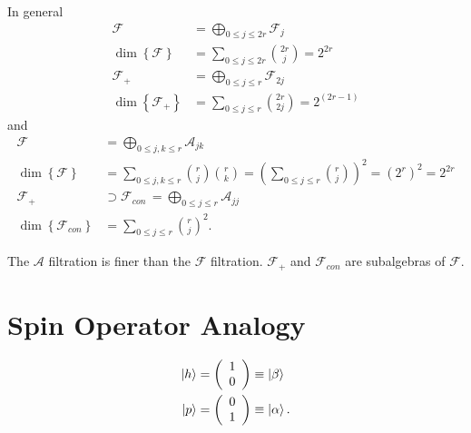 \documentclass[aps,preprint]{revtex4}%
\begin{document}
In general
\begin{align}
\mathcal{F}  &  =%
{\displaystyle\bigoplus\limits_{0\leq j\leq2r}}
\mathcal{F}_{j}\\
\dim\left\{  \mathcal{F}\right\}   &  =%
{\displaystyle\sum\limits_{0\leq j\leq2r}}
\binom{2r}{j}=2^{2r}\\
\mathcal{F}_{+}  &  =%
{\displaystyle\bigoplus\limits_{0\leq j\leq r}}
\mathcal{F}_{2j}\\
\dim\left\{  \mathcal{F}_{+}\right\}   &  =%
{\displaystyle\sum\limits_{0\leq j\leq r}}
\binom{2r}{2j}=2^{\left(  2r-1\right)  }%
\end{align}
and
\begin{align}
\mathcal{F}  &  =%
{\displaystyle\bigoplus\limits_{0\leq j,k\leq r}}
\mathcal{A}_{jk}\\
\dim\left\{  \mathcal{F}\right\}   &  =%
{\displaystyle\sum\limits_{0\leq j,k\leq r}}
\binom{r}{j}\binom{r}{k}=\left(
{\displaystyle\sum\limits_{0\leq j\leq r}}
\binom{r}{j}\right)  ^{2}=\left(  2^{r}\right)  ^{2}=2^{2r}\\
\mathcal{F}_{+}  &  \supset\mathcal{F}_{con}\,\mathcal{=}%
{\displaystyle\bigoplus\limits_{0\leq j\leq r}}
\mathcal{A}_{jj}\\
\dim\left\{  \mathcal{F}_{con}\right\}   &  =%
{\displaystyle\sum\limits_{0\leq j\leq r}}
\binom{r}{j}^{2}.
\end{align}


The $\mathcal{A}$ filtration is finer than the $\mathcal{F}$ filtration.
$\mathcal{F}_{+}$ and $\mathcal{F}_{con}$ are subalgebras of $\mathcal{F}.$

\section{Spin Operator Analogy}%

\begin{align}
\left\vert h\right\rangle  &  =\left(
\begin{array}
[c]{c}%
1\\
0
\end{array}
\right)  \equiv\left\vert \beta\right\rangle \\
\left\vert p\right\rangle  &  =\left(
\begin{array}
[c]{c}%
0\\
1
\end{array}
\right)  \equiv\left\vert \alpha\right\rangle .
\end{align}
%
\end{document}
